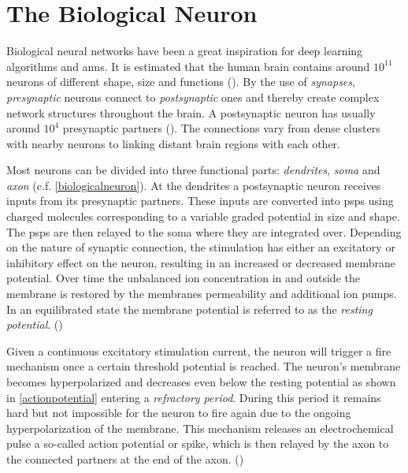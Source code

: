 
\section{The Biological Neuron}

Biological neural networks have been a great inspiration for deep learning algorithms and \glspl{ann}. It is estimated that the human brain contains around $10^{11}$ neurons of different shape, size and functions (\citealp{numberofneurons}). By the use of \emph{synapses}, \emph{presynaptic} neurons connect to \emph{postsynaptic} ones and thereby create complex network structures throughout the brain. A postsynaptic neuron has usually around $10^4$ presynaptic partners (\citealp{numberofsynapses}). The connections vary from dense clusters with nearby neurons to linking distant brain regions with each other. 

Most neurons can be divided into three functional parts: \emph{dendrites}, \emph{soma} and \emph{axon} (c.f. \cref{biologicalneuron}). At the dendrites a postsynaptic neuron receives inputs from its presynaptic partners. These inputs are converted into \glspl{psp} using charged molecules corresponding to a variable graded potential in size and shape. The \glspl{psp} are then relayed to the soma where they are integrated over. Depending on the nature of synaptic connection, the stimulation has either an excitatory or inhibitory effect on the neuron, resulting in an increased or decreased membrane potential. Over time the unbalanced ion concentration in and outside the membrane is restored by the membranes permeability and additional ion pumps. In an equilibrated state the membrane potential is referred to as the \emph{resting potential}. (\citealp{gerstner2014dynamics})

Given a continuous excitatory stimulation current, the neuron will trigger a fire mechanism once a certain threshold potential is reached. The neuron's membrane becomes hyperpolarized and decreases even below the resting potential as shown in \cref{actionpotential} entering a \emph{refractory period}. During this period it remains hard but not impossible for the neuron to fire again due to the ongoing hyperpolarization of the membrane. This mechanism releases an electrochemical pulse a so-called action potential or spike, which is then relayed by the axon to the connected partners at the end of the axon. (\citealp{gerstner2014dynamics})

